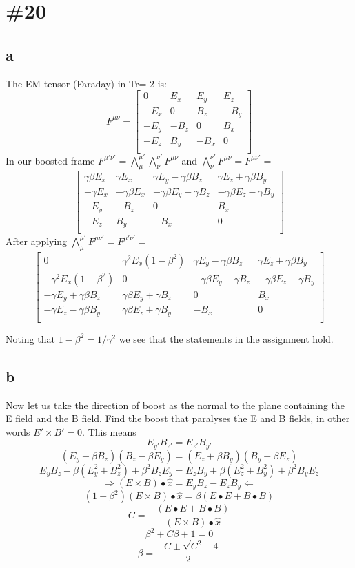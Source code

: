 \documentclass[11pt,a4paper]{article}
\begin{document}
\section{\#20}
\subsection{a}
The EM tensor (Faraday) in Tr=-2 is:
\[
F^{\mu\nu}=
\begin{bmatrix}
0 & E_x & E_y & E_z\\
-E_x & 0 & B_z & -B_y\\
-E_y & -B_z & 0 & B_x\\
-E_z & B_y & -B_x & 0\\
\end{bmatrix}
\]
In our boosted frame $F^{\mu'\nu'}=\bigwedge^{\mu'}_{\mu}\bigwedge^{\nu'}_{\nu}F^{\mu\nu}$ and $\bigwedge^{\nu'}_{\nu}F^{\mu\nu}=F^{\mu\nu'}=$
\[
\begin{bmatrix}
\gamma\beta E_x & \gamma E_x & \gamma E_y-\gamma \beta B_z & \gamma E_z+\gamma \beta B_y\\
-\gamma E_x & -\gamma \beta E_x & -\gamma \beta E_y-\gamma B_z & -\gamma\beta E_z-\gamma B_y\\
-E_y & -B_z & 0 & B_x\\
-E_z & B_y & -B_x & 0\\
\end{bmatrix}
\]
After applying $\bigwedge^{\mu'}_{\mu}F^{\mu\nu'}=F^{\mu'\nu'}=$
\[
\begin{bmatrix}
0 & \gamma^2 E_x(1-\beta^2) & \gamma E_y-\gamma \beta B_z & \gamma E_z+\gamma \beta B_y\\
-\gamma^2 E_x(1-\beta^2) & 0 & -\gamma \beta E_y-\gamma B_z & -\gamma\beta E_z-\gamma B_y\\
-\gamma E_y+\gamma \beta B_z & \gamma \beta E_y+\gamma B_z & 0 & B_x\\
-\gamma E_z-\gamma \beta B_y & \gamma\beta E_z+\gamma B_y & -B_x & 0\\
\end{bmatrix}
\]

Noting that $1-\beta^2=1/\gamma^2$ we see that the statements in the assignment hold.


\subsection{b}
Now let us take the direction of boost as the normal to the plane containing the E field and the B field.  Find the boost that paralyses the E and B fields, in other words $E'\times B'=0$.  This means 
\[E_{y'}B_{z'}=E_{z'}B_{y'}\]
\[(E_y-\beta B_z)(B_z-\beta E_y)=(E_z+\beta B_y)(B_y+\beta E_z)\]
\[E_yB_z-\beta (E_y^2+B_z^2)+\beta^2B_zE_y=E_zB_y+\beta (E_z^2+B_y^2)+\beta^2B_yE_z\]
\[\Rightarrow (E\times B)\bullet \hat{x}=E_yB_z-E_zB_y\Leftarrow\]
\[(1+\beta^2)(E\times B)\bullet \hat{x}=\beta(E\bullet E+B\bullet B)\]
\[C=-\frac{(E\bullet E+B\bullet B)}{(E\times B)\bullet \hat{x}}\]
\[\beta^2+C\beta +1=0\]
\[\beta=\frac{-C\pm \sqrt{C^2-4}}{2}\]
\end{document}
